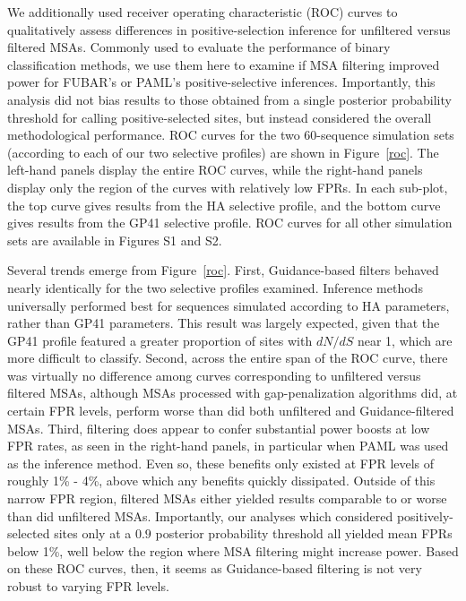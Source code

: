 \documentclass[11pt]{article}
\begin{document}
We additionally used receiver operating characteristic (ROC) curves to qualitatively assess differences in positive-selection inference for unfiltered versus filtered MSAs. Commonly used to evaluate the performance of binary classification methods, we use them here to examine if MSA filtering improved power for FUBAR's or PAML's positive-selective inferences. Importantly, this analysis did not bias results to those obtained from a single posterior probability threshold for calling positive-selected sites, but instead considered the overall methodological performance. ROC curves for the two 60-sequence simulation sets (according to each of our two selective profiles) are shown in Figure~\ref{roc}. The left-hand panels display the entire ROC curves, while the right-hand panels display only the region of the curves with relatively low FPRs. In each sub-plot, the top curve gives results from the HA selective profile, and the bottom curve gives results from the GP41 selective profile. ROC curves for all other simulation sets are available in Figures S1 and S2.

Several trends emerge from Figure~\ref{roc}. First, Guidance-based filters behaved nearly identically for the two selective profiles examined. Inference methods universally performed best for sequences simulated according to HA parameters, rather than GP41 parameters. This result was largely expected, given that the GP41 profile featured a greater proportion of sites with $dN/dS$ near 1, which are more difficult to classify. Second, across the entire span of the ROC curve, there was virtually no difference among curves corresponding to unfiltered versus filtered MSAs, although MSAs processed with gap-penalization algorithms did, at certain FPR levels, perform worse than did both unfiltered and Guidance-filtered MSAs. Third, filtering does appear to confer substantial power boosts at low FPR rates, as seen in the right-hand panels, in particular when PAML was used as the inference method. Even so, these benefits only existed at FPR levels of roughly 1\% - 4\%, above which any benefits quickly dissipated. Outside of this narrow FPR region, filtered MSAs either yielded results comparable to or worse than did unfiltered MSAs. Importantly, our analyses which considered positively-selected sites only at a $0.9$ posterior probability threshold all yielded mean FPRs below 1\%, well below the region where MSA filtering might increase power. Based on these ROC curves, then, it seems as Guidance-based filtering is not very robust to varying FPR levels. 
\end{document}
